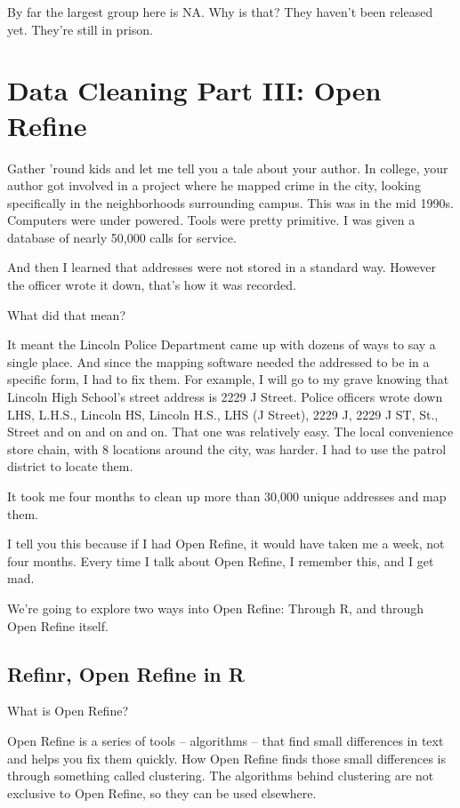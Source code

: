 \documentclass[]{book}
\begin{document}
By far the largest group here is NA. Why is that? They haven't been released yet. They're still in prison.

\hypertarget{data-cleaning-part-iii-open-refine}{%
\chapter{Data Cleaning Part III: Open Refine}\label{data-cleaning-part-iii-open-refine}}

Gather 'round kids and let me tell you a tale about your author. In college, your author got involved in a project where he mapped crime in the city, looking specifically in the neighborhoods surrounding campus. This was in the mid 1990s. Computers were under powered. Tools were pretty primitive. I was given a database of nearly 50,000 calls for service.

And then I learned that addresses were not stored in a standard way. However the officer wrote it down, that's how it was recorded.

What did that mean?

It meant the Lincoln Police Department came up with dozens of ways to say a single place. And since the mapping software needed the addressed to be in a specific form, I had to fix them. For example, I will go to my grave knowing that Lincoln High School's street address is 2229 J Street. Police officers wrote down LHS, L.H.S., Lincoln HS, Lincoln H.S., LHS (J Street), 2229 J, 2229 J ST, St., Street and on and on and on. That one was relatively easy. The local convenience store chain, with 8 locations around the city, was harder. I had to use the patrol district to locate them.

It took me four months to clean up more than 30,000 unique addresses and map them.

I tell you this because if I had Open Refine, it would have taken me a week, not four months.
Every time I talk about Open Refine, I remember this, and I get mad.

We're going to explore two ways into Open Refine: Through R, and through Open Refine itself.

\hypertarget{refinr-open-refine-in-r}{%
\section{Refinr, Open Refine in R}\label{refinr-open-refine-in-r}}

What is Open Refine?

Open Refine is a series of tools -- algorithms -- that find small differences in text and helps you fix them quickly. How Open Refine finds those small differences is through something called clustering. The algorithms behind clustering are not exclusive to Open Refine, so they can be used elsewhere.
\end{document}

